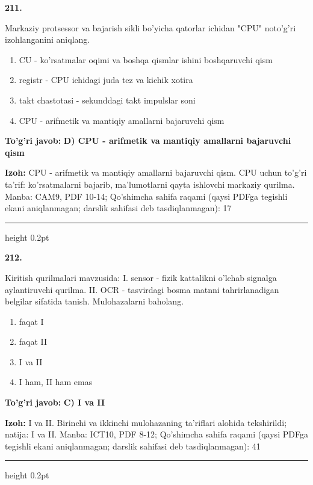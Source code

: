 \documentclass[10pt,a4paper]{article}
\begin{document}
{\bfseries\sffamily\color{ink} 211.}
\par
Markaziy protsessor va bajarish sikli bo'yicha qatorlar ichidan "CPU" noto'g'ri izohlanganini aniqlang.
\begin{enumerate}[label=\Alph*),leftmargin=9mm]
\item CU - ko'rsatmalar oqimi va boshqa qismlar ishini boshqaruvchi qism
\item registr - CPU ichidagi juda tez va kichik xotira
\item takt chastotasi - sekunddagi takt impulslar soni
\item CPU - arifmetik va mantiqiy amallarni bajaruvchi qism
\end{enumerate}
\begin{tcolorbox}[enhanced,breakable,colback=teal!4,colframe=teal!60!black,boxrule=0.45pt,arc=1.2mm,left=2.7mm,right=2.7mm,top=1.8mm,bottom=1.8mm,before skip=2mm,after skip=2mm]
{\bfseries\sffamily\color{teal}To'g'ri javob:} \textbf{D) CPU - arifmetik va mantiqiy amallarni bajaruvchi qism}
\par\smallskip
{\bfseries Izoh:} CPU - arifmetik va mantiqiy amallarni bajaruvchi qism. CPU uchun to'g'ri ta'rif: ko'rsatmalarni bajarib, ma'lumotlarni qayta ishlovchi markaziy qurilma. Manba: CAM9, PDF 10-14; Qo'shimcha sahifa raqami (qaysi PDFga tegishli ekani aniqlanmagan; darslik sahifasi deb tasdiqlanmagan): 17
\end{tcolorbox}
\vspace{2mm}\hrule height 0.2pt\vspace{3mm}

{\bfseries\sffamily\color{ink} 212.}
\par
Kiritish qurilmalari mavzusida: I. sensor - fizik kattalikni o'lchab signalga aylantiruvchi qurilma. II. OCR - tasvirdagi bosma matnni tahrirlanadigan belgilar sifatida tanish. Mulohazalarni baholang.
\begin{enumerate}[label=\Alph*),leftmargin=9mm]
\item faqat I
\item faqat II
\item I va II
\item I ham, II ham emas
\end{enumerate}
\begin{tcolorbox}[enhanced,breakable,colback=teal!4,colframe=teal!60!black,boxrule=0.45pt,arc=1.2mm,left=2.7mm,right=2.7mm,top=1.8mm,bottom=1.8mm,before skip=2mm,after skip=2mm]
{\bfseries\sffamily\color{teal}To'g'ri javob:} \textbf{C) I va II}
\par\smallskip
{\bfseries Izoh:} I va II. Birinchi va ikkinchi mulohazaning ta'riflari alohida tekshirildi; natija: I va II. Manba: ICT10, PDF 8-12; Qo'shimcha sahifa raqami (qaysi PDFga tegishli ekani aniqlanmagan; darslik sahifasi deb tasdiqlanmagan): 41
\end{tcolorbox}
\vspace{2mm}\hrule height 0.2pt\vspace{3mm}
\end{document}
